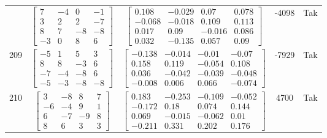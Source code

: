\documentclass[a4paper,12pt]{article}
\begin{document}
\begin{tabular}{c c c c c}
&
$\begin{bmatrix} 7 & -4 & 0 & -1 \\ 3 & 2 & 2 & -7 \\ 8 & 7 & -8 & -8 \\ -3 & 0 & 8 & 6 \end{bmatrix}$
&
$\begin{bmatrix} 0.108 & -0.029 & 0.07 & 0.078 \\ -0.068 & -0.018 & 0.109 & 0.113 \\ 0.017 & 0.09 & -0.016 & 0.086 \\ 0.032 & -0.135 & 0.057 & 0.09 \end{bmatrix}$
&
-4098
&
Tak
\\
209
&
$\begin{bmatrix} -5 & 1 & 5 & 3 \\ 8 & 8 & -3 & 6 \\ -7 & -4 & -8 & 6 \\ -5 & -3 & -8 & -8 \end{bmatrix}$
&
$\begin{bmatrix} -0.138 & -0.014 & -0.01 & -0.07 \\ 0.158 & 0.119 & -0.054 & 0.108 \\ 0.036 & -0.042 & -0.039 & -0.048 \\ -0.008 & 0.006 & 0.066 & -0.074 \end{bmatrix}$
&
-7929
&
Tak
\\
210
&
$\begin{bmatrix} 3 & -8 & 8 & 7 \\ -6 & -4 & 9 & 1 \\ 6 & -7 & -9 & 8 \\ 8 & 6 & 3 & 3 \end{bmatrix}$
&
$\begin{bmatrix} 0.183 & -0.253 & -0.109 & -0.052 \\ -0.172 & 0.18 & 0.074 & 0.144 \\ 0.069 & -0.015 & -0.062 & 0.01 \\ -0.211 & 0.331 & 0.202 & 0.176 \end{bmatrix}$
&
4700
&
Tak
\\
\end{tabular} \egroup \newpage
\end{document}
